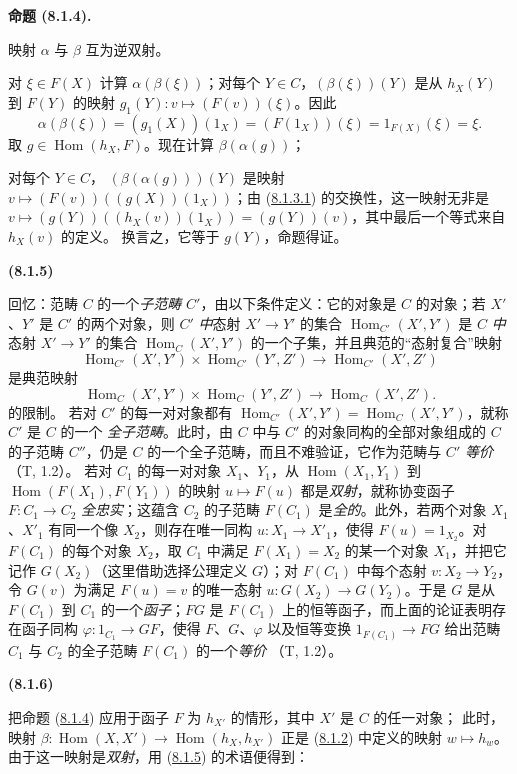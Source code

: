 \documentclass[UTF8,fontset=none,11pt,oneside,openany]{ctexbook}
\newenvironment{env}[1][]{%
  \par\medskip\noindent\textbf{(#1)}\ %
}{\par}
\newenvironment{proposition}[1][]{%
  \par\medskip\noindent\textbf{命题 (#1).}\ %
}{\par}
\newcommand{\oldpage}[2][]{%
  \hypertarget{ega-source-page-#1-#2}{}%
  \marginnote{\scriptsize\textbf{#1}~|~#2}\ignorespaces}
\let\EGAOriginalLabel\label
\renewcommand{\label}[1]{\phantomsection\EGAOriginalLabel{#1}}
\begin{document}
\begin{proposition}[8.1.4]
\label{0.8.1.4-fr}
映射 $\alpha$ 与 $\beta$ 互为逆双射。
\end{proposition}
对 $\xi\in F(X)$ 计算 $\alpha(\beta(\xi))$；对每个 $Y\in C$，$(\beta(\xi))(Y)$ 是从
$h_X(Y)$ 到 $F(Y)$ 的映射 $g_1(Y):v\mapsto(F(v))(\xi)$。因此
\[
  \alpha(\beta(\xi))=(g_1(X))(1_X)=(F(1_X))(\xi)
  =1_{F(X)}(\xi)=\xi.
\]
取 $g\in\operatorname{Hom}(h_X,F)$。现在计算 $\beta(\alpha(g))$；\par\noindent
对每个 $Y\in C$，
$(\beta(\alpha(g)))(Y)$ 是映射
$v\mapsto(F(v))((g(X))(1_X))$；由
(\hyperref[0.8.1.3.1-fr]{8.1.3.1}) 的交换性，这一映射无非是
$v\mapsto(g(Y))((h_X(v))(1_X))=(g(Y))(v)$，其中最后一个等式来自 $h_X(v)$ 的定义。
换言之，它等于 $g(Y)$，命题得证。
\begin{env}[8.1.5]
\label{0.8.1.5-fr}
回忆：范畴 $C$ 的一个\emph{子范畴} $C'$，由以下条件定义：它的对象是 $C$ 的对象；若
$X'$、$Y'$ 是 $C'$ 的两个对象，则 $C'$ \emph{中}态射 $X'\to Y'$ 的集合
$\operatorname{Hom}_{C'}(X',Y')$ 是 $C$ \emph{中}态射 $X'\to Y'$ 的集合
$\operatorname{Hom}_C(X',Y')$ 的一个子集，并且典范的“态射复合”映射
\[
  \operatorname{Hom}_{C'}(X',Y')\times\operatorname{Hom}_{C'}(Y',Z')
  \to\operatorname{Hom}_{C'}(X',Z')
\]
\oldpage[0\textsubscript{III}]{7}
是典范映射
\[
  \operatorname{Hom}_C(X',Y')\times\operatorname{Hom}_C(Y',Z')
  \to\operatorname{Hom}_C(X',Z').
\]
的限制。
若对 $C'$ 的每一对对象都有
$\operatorname{Hom}_{C'}(X',Y')=\operatorname{Hom}_C(X',Y')$，就称 $C'$ 是 $C$ 的一个
\emph{全子范畴}。此时，由 $C$ 中与 $C'$ 的对象同构的全部对象组成的 $C$ 的子范畴 $C''$，仍是
$C$ 的一个全子范畴，而且不难验证，它作为范畴与 $C'$ \emph{等价}（T, 1.2）。
若对 $C_1$ 的每一对对象 $X_1$、$Y_1$，从
$\operatorname{Hom}(X_1,Y_1)$ 到
$\operatorname{Hom}(F(X_1),F(Y_1))$ 的映射 $u\mapsto F(u)$ 都是\emph{双射}，就称协变函子
$F:C_1\to C_2$ \emph{全忠实}；这蕴含 $C_2$ 的子范畴 $F(C_1)$ 是\emph{全的}。此外，若两个对象
$X_1$、$X'_1$ 有同一个像 $X_2$，则存在唯一同构 $u:X_1\to X'_1$，使得
$F(u)=1_{X_2}$。对 $F(C_1)$ 的每个对象 $X_2$，取 $C_1$ 中满足 $F(X_1)=X_2$ 的某一个对象
$X_1$，并把它记作 $G(X_2)$（这里借助选择公理定义 $G$）；对 $F(C_1)$ 中每个态射
$v:X_2\to Y_2$，令 $G(v)$ 为满足 $F(u)=v$ 的唯一态射
$u:G(X_2)\to G(Y_2)$。于是 $G$ 是从 $F(C_1)$ 到 $C_1$ 的一个\emph{函子}；$FG$ 是
$F(C_1)$ 上的恒等函子，而上面的论证表明存在函子同构
$\varphi:1_{C_1}\to GF$，使得 $F$、$G$、$\varphi$ 以及恒等变换
$1_{F(C_1)}\to FG$ 给出范畴 $C_1$ 与 $C_2$ 的全子范畴 $F(C_1)$ 的一个\emph{等价}
（T, 1.2）。
\end{env}
\begin{env}[8.1.6]
\label{0.8.1.6-fr}
把命题 (\hyperref[0.8.1.4-fr]{8.1.4}) 应用于函子 $F$ 为 $h_{X'}$ 的情形，其中 $X'$ 是 $C$ 的任一对象；
此时，映射
$\beta:\operatorname{Hom}(X,X')\to\operatorname{Hom}(h_X,h_{X'})$ 正是
(\hyperref[0.8.1.2-fr]{8.1.2}) 中定义的映射 $w\mapsto h_w$。由于这一映射是\emph{双射}，用
(\hyperref[0.8.1.5-fr]{8.1.5}) 的术语便得到：
\end{env}
\end{document}
